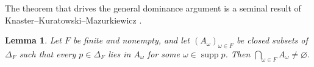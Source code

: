 \documentclass[11pt]{article}
\newtheorem{lemma}[theorem]{Lemma}
\theoremstyle{definition}
\theoremstyle{remark}
\newcommand{\supp}{\operatorname{supp}}
\begin{document}
The theorem that drives the general dominance argument is a seminal result of Knaster--Kuratowski--Mazurkiewicz {\cite{KKM1929}}.

\begin{lemma}\label{lem:kkm}
Let $F$ be finite and nonempty, and let $(A_\omega)_{\omega\in F}$ be closed subsets of $\Delta_F$ such that every $p\in\Delta_F$ lies in $A_\omega$ for some $\omega\in\supp p$. Then $\bigcap_{\omega\in F}A_\omega\ne\varnothing$.
\end{lemma}

\end{document}
